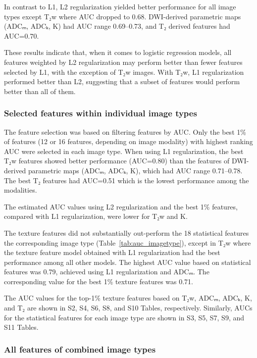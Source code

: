 \documentclass[10pt,letterpaper]{article}
\begin{document}
In contrast to L1, L2 regularization yielded better performance for all image
types except T₂w where AUC dropped to 0.68. DWI-derived parametric maps (ADCₘ,
ADCₖ, K) had AUC range 0.69--0.73, and T₂ derived features had AUC=0.70.

These results indicate that, when it comes to logistic regression models, all
features weighted by L2 regularization may perform better than fewer features
selected by L1, with the exception of T₂w images. With T₂w, L1 regularization
performed better than L2, suggesting that a subset of features would perform
better than all of them.


\subsubsection{Selected features within individual image types}

The feature selection was based on filtering features by AUC\@. Only the best
1\% of features (12 or 16 features, depending on image modality) with highest
ranking AUC were selected in each image type. When using L1 regularization, the
best T₂w features showed better performance (AUC=0.80) than the features of
DWI-derived parametric maps (ADCₘ, ADCₖ, K), which had AUC range 0.71--0.78. The
best T₂ features had AUC=0.51 which is the lowest performance among the
modalities.

The estimated AUC values using L2 regularization and the best 1\% features,
compared with L1 regularization, were lower for T₂w and K.

The texture features did not substantially out-perform the 18 statistical
features the corresponding image type (Table~\ref{tab:auc_imagetype}), except in
T₂w where the texture feature model obtained with L1 regularization had the best
performance among all other models. The highest AUC value based on statistical
features was 0.79, achieved using L1 regularization and ADCₘ. The corresponding
value for the best 1\% texture features was 0.71.

The AUC values for the top-1\% texture features based on T₂w, ADCₘ, ADCₖ, K,
and T₂ are shown in S2, S4, S6, S8, and S10 Tables, respectively. Similarly,
AUCs for the statistical features for each image type are shown in S3, S5, S7,
S9, and S11 Tables.


\subsubsection{All features of combined image types}
\end{document}
